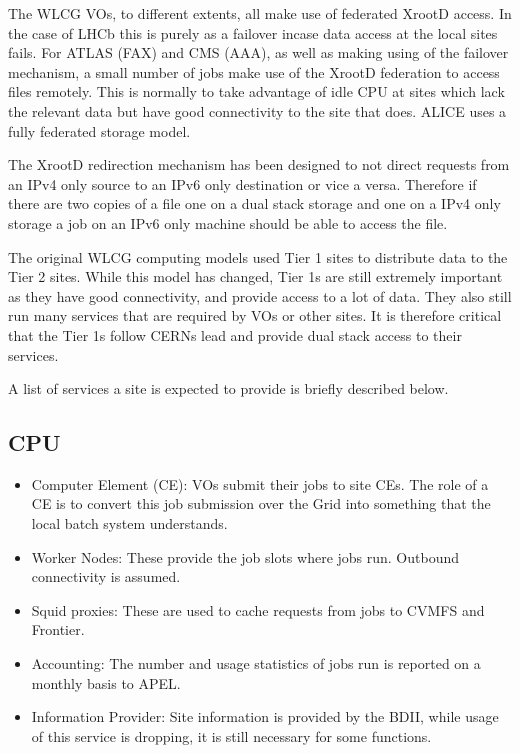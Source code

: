 \documentclass[11pt]{article}
\begin{document}
The WLCG VOs, to different extents, all make use of federated XrootD access.  In the case of LHCb this is purely as a failover incase data access at the local sites fails.  For ATLAS (FAX) and CMS (AAA), as well as making using of the failover mechanism, a small number of jobs make use of the XrootD federation to access files remotely.  This is normally to take advantage of idle CPU at sites which lack the relevant data but have good connectivity to the site that does.  ALICE uses a fully federated storage model.  

The XrootD redirection mechanism has been designed to not direct requests from an IPv4 only source to an IPv6 only destination or vice a versa.  Therefore if there are two copies of a file one on a dual stack storage and one on a IPv4 only storage a job on an IPv6 only machine should be able to access the file.

The original WLCG computing models used Tier 1 sites to distribute data to the Tier 2 sites.  While this model has changed, Tier 1s are still extremely important as they have good connectivity, and provide access to a lot of data.  They also still run many services that are required by VOs or other sites.  It is therefore critical that the Tier 1s follow CERNs lead and provide dual stack access to their services.

A list of services a site is expected to provide is briefly described below.
\subsection{CPU}
\begin{itemize}
\item Computer Element (CE): VOs submit their jobs to site CEs.  The role of a CE is to convert this job submission over the Grid into something that the local batch system understands.
\item Worker Nodes: These provide the job slots where jobs run.  Outbound connectivity is assumed.
\item Squid proxies: These are used to cache requests from jobs to CVMFS and Frontier.
\item Accounting: The number and usage statistics of jobs run is reported on a monthly basis to APEL.
\item Information Provider: Site information is provided by the BDII, while usage of this service is dropping, it is still necessary for some functions.
\end{itemize}
\end{document}
